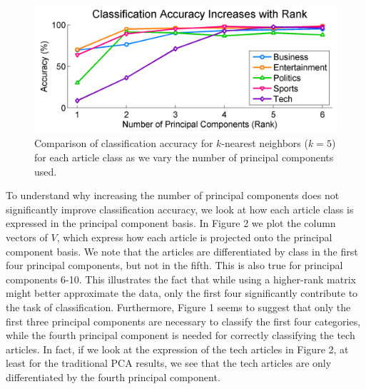 \documentclass[12pt]{article}
\begin{document}
\begin{figure}[H]
\centering
\includegraphics[width=.6\textwidth]{figures/accuracybyrank}
\caption{Comparison of classification accuracy for $k$-nearest neighbors ($k = 5$) for each article class as we vary the number of principal components used.}
\label{class_accuracy}
\end{figure}

To understand why increasing the number of principal components does not significantly improve classification accuracy, we look at how each article class is expressed in the principal component basis. In Figure 2 we plot the column vectors of $V$, which express how each article is projected onto the principal component basis. We note that the articles are differentiated by class in the first four principal components, but not in the fifth. This is also true for principal components 6-10. This illustrates the fact that while using a higher-rank matrix might better approximate the data, only the first four significantly contribute to the task of classification. Furthermore, Figure 1 seems to suggest that only the first three principal components are necessary to classify the first four categories, while the fourth principal component is needed for correctly classifying the tech articles. In fact, if we look at the expression of the tech articles in Figure 2, at least for the traditional PCA results, we see that the tech articles are only differentiated by the fourth principal component. 
\end{document}
